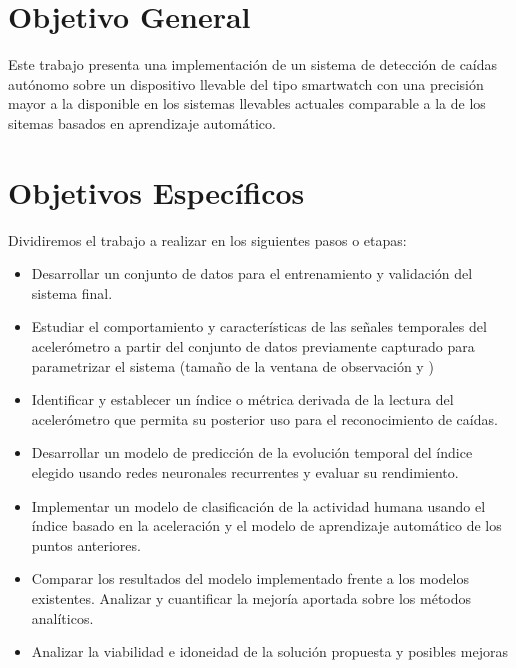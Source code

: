 \documentclass[../tfm.tex]{subfiles}
\begin{document}



\section{Objetivo General}

Este trabajo presenta una implementación de un sistema de detección de caídas autónomo sobre un dispositivo llevable del tipo smartwatch con una precisión mayor a la disponible en los sistemas llevables actuales comparable a la de los sitemas basados en aprendizaje automático.

\section{Objetivos Específicos}

Dividiremos el trabajo a realizar en los siguientes pasos o etapas:
\begin{itemize}
  \item Desarrollar un conjunto de datos para el entrenamiento y validación del sistema final.
  \item Estudiar el comportamiento y características de las señales temporales del acelerómetro a partir del conjunto de datos previamente capturado para parametrizar el sistema (tamaño de la ventana de observación y )
  \item Identificar y establecer un índice o métrica derivada de la lectura del acelerómetro que permita su posterior uso para el reconocimiento de caídas.
  \item Desarrollar un modelo de predicción de la evolución temporal del índice elegido usando redes neuronales recurrentes y evaluar su rendimiento.
  \item Implementar un modelo de clasificación de la actividad humana usando el índice basado en la aceleración y el modelo de aprendizaje automático de los puntos anteriores.
  \item Comparar los resultados del modelo implementado frente a los modelos existentes. Analizar y cuantificar la mejoría aportada sobre los métodos analíticos.
  \item Analizar la viabilidad e idoneidad de la solución propuesta y posibles mejoras
\end{itemize}
\end{document}
